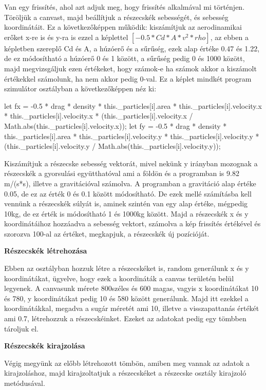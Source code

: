 Van egy frissítés, ahol azt adjuk meg, hogy frissítés alkalmával mi történjen. Töröljük a canvast, majd beállítjuk a részecskék sebességét, és sebesség koordinátáit. Ez a következőképpen működik: kiszámítjuk az aerodinamikai erőket x-re is és y-ra is ezzel a képlettel $[-0.5 * Cd * A * v^2 * rho]$, az ebben a képletben szereplő Cd és A, a húzóerő és a sűrűség, ezek alap értéke 0.47 és 1.22, de ez módosítható a húzóerő 0 és 1 között, a sűrűség pedig 0 és 1000 között, majd megvizsgáljuk ezen értékeket, hogy számok-e ha számok akkor a kiszámolt értékekkel számolunk, ha nem akkor pedig 0-val. Ez a képlet mindkét program szimulátor osztályban a következőképpen néz ki:
\begin{java}
let fx = -0.5 * drag * density * this._particles[i].area *
  this._particles[i].velocity.x *
  this._particles[i].velocity.x *
  (this._particles[i].velocity.x /
  Math.abs(this._particles[i].velocity.x));
let fy = -0.5 * drag * density *
  this._particles[i].area *
  this._particles[i].velocity.y *
  this._particles[i].velocity.y *
  (this._particles[i].velocity.y /
  Math.abs(this._particles[i].velocity.y));
\end{java}
Kiszámítjuk a részecske sebesség vektorát, mivel nekünk y irányban mozognak a részecskék a gyorsulási együtthatóval ami a földön és a programban is 9.82 m/(s*s), illetve a gravitációval számolva. A programban a gravitáció alap értéke 0.05, de ez az érték 0 és 0.1 között módosítható. De ezek mellé számításba kell vennünk a részecskék súlyát is, aminek szintén van egy alap értéke, mégpedig 10kg, de ez érték is módosítható 1 és 1000kg között. Majd a részecskék x és y koordinátáihoz hozzáadva a sebesség vektort, számolva a kép frissítés értékével és szorozva 100-al az értéket, megkapjuk, a részecskék új pozícióját.

\textbf{Részecskék létrehozása}

Ebben az osztályban hozzuk létre a részecskéket is, random generálunk x és y koordinátákat, ügyelve, hogy ezek a koordináták a canvas területén belül legyenek. A canvasunk mérete 800széles és 600 magas, vagyis x koordinátákat 10 és 780, y koordinátákat pedig 10 és 580 között generálunk. Majd itt ezekkel a koordinátákkal, megadva a sugár méretét ami 10, illetve a visszapattanás értékét ami 0.7, létrehozzuk a részecskéinket. Ezeket az adatokat pedig egy tömbben tároljuk el. 

\textbf{Részecskék kirajzolása}


Végig megyünk az előbb létrehozott tömbön, amiben meg vannak az adatok a kirajzoláshoz, majd kirajzoltatjuk a részecskéket a részecske osztály kirajzoló metódusával. 


